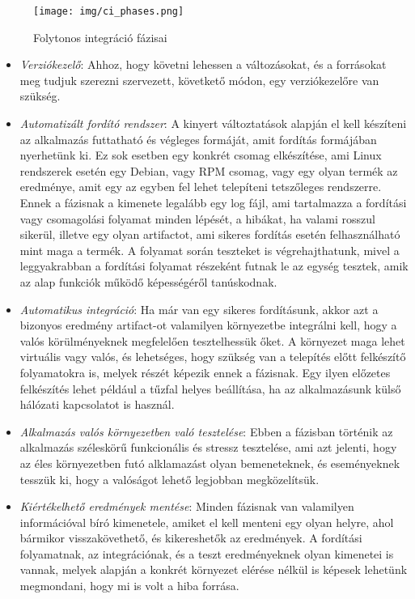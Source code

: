 \documentclass[11pt,magyar,a4paper,twoside,]{report}
\providecommand{\tightlist}{%
  \setlength{\itemsep}{0pt}\setlength{\parskip}{0pt}}
\begin{document}
\begin{figure}[H]
\centering
\texttt{[image: img/ci\_phases.png]}
\caption{Folytonos integráció fázisai}
\end{figure}

\begin{itemize}
\tightlist
\item
  \emph{Verziókezelő}: Ahhoz, hogy követni lehessen a változásokat, és a
  forrásokat meg tudjuk szerezni szervezett, követkető módon, egy
  verziókezelőre van szükség.
\item
  \emph{Automatizált fordító rendszer}: A kinyert változtatások alapján
  el kell készíteni az alkalmazás futtatható és végleges formáját, amit
  fordítás formájában nyerhetünk ki. Ez sok esetben egy konkrét csomag
  elkészítése, ami Linux rendszerek esetén egy Debian, vagy RPM csomag,
  vagy egy olyan termék az eredménye, amit egy az egyben fel lehet
  telepíteni tetszőleges rendszerre. Ennek a fázisnak a kimenete
  legalább egy log fájl, ami tartalmazza a fordítási vagy csomagolási
  folyamat minden lépését, a hibákat, ha valami rosszul sikerül, illetve
  egy olyan artifactot, ami sikeres fordítás esetén felhasználható mint
  maga a termék. A folyamat során teszteket is végrehajthatunk, mivel a
  leggyakrabban a fordítási folyamat részeként futnak le az egység
  tesztek, amik az alap funkciók működő képességéről tanúskodnak.
\item
  \emph{Automatikus integráció}: Ha már van egy sikeres fordításunk,
  akkor azt a bizonyos eredmény artifact-ot valamilyen környezetbe
  integrálni kell, hogy a valós körülményeknek megfelelően tesztelhessük
  őket. A környezet maga lehet virtuális vagy valós, és lehetséges, hogy
  szükség van a telepítés előtt felkészítő folyamatokra is, melyek
  részét képezik ennek a fázisnak. Egy ilyen előzetes felkészítés lehet
  például a tűzfal helyes beállítása, ha az alkalmazásunk külső hálózati
  kapcsolatot is használ.
\item
  \emph{Alkalmazás valós környezetben való tesztelése}: Ebben a fázisban
  történik az alkalmazás széleskörű funkcionális és stressz tesztelése,
  ami azt jelenti, hogy az éles környezetben futó alklamazást olyan
  bemeneteknek, és eseményeknek tesszük ki, hogy a valóságot lehető
  legjobban megközelítsük.
\item
  \emph{Kiértékelhető eredmények mentése}: Minden fázisnak van
  valamilyen információval bíró kimenetele, amiket el kell menteni egy
  olyan helyre, ahol bármikor visszakövethető, és kikereshetők az
  eredmények. A fordítási folyamatnak, az integrációnak, és a teszt
  eredményeknek olyan kimenetei is vannak, melyek alapján a konkrét
  környezet elérése nélkül is képesek lehetünk megmondani, hogy mi is
  volt a hiba forrása.
\end{itemize}
\end{document}
